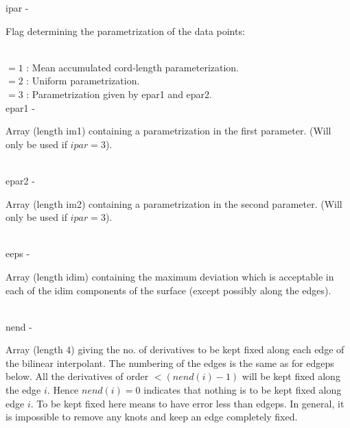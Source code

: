         \>\>    {\fov ipar}\> - \>  \begin{minipg2}
                     Flag determining the parametrization of the data points:
                               \end{minipg2}\\[0.8ex]
          \>\>\>\>  $= 1$  : Mean accumulated cord-length parameterization.\\
          \>\>\>\>  $= 2$  : Uniform parametrization.\\
          \>\>\>\>  $= 3$  : Parametrization given by epar1 and epar2.\\
        \>\>    {\fov epar1}\> - \>  \begin{minipg2}
                     Array (length im1) containing a parametrization
                  in the first parameter. (Will only
                  be used if $ipar=3$).
                               \end{minipg2}\\[0.8ex]
        \>\>    {\fov epar2}\> - \>  \begin{minipg2}
                     Array (length im2) containing a parametrization
                  in the second parameter. (Will only
                  be used if $ipar=3$).
                               \end{minipg2}\\[0.8ex]
        \>\>    {\fov eeps}\> - \>  \begin{minipg2}
                     Array (length idim) containing the maximum deviation
                  which is acceptable in each of the idim components of
                  the surface (except possibly along the edges).
                               \end{minipg2}\\[0.8ex]
        \>\>    {\fov nend}\> - \>  \begin{minipg2}
                     Array (length 4) giving the no. of derivatives to be
                  kept fixed along each edge of the bilinear interpolant.
                  The numbering of the edges is the same as for edgeps below.
                  All the derivatives of order $< (nend(i)-1)$ will be kept
                  fixed along the edge $i$. Hence $nend(i)=0$ indicates that
                  nothing is to be kept fixed along edge $i$.
                  To be kept fixed here means to have error less than edgeps.
                  In general, it is impossible to remove any knots and keep
                  an edge completely fixed.
                               \end{minipg2}\\[0.8ex]
